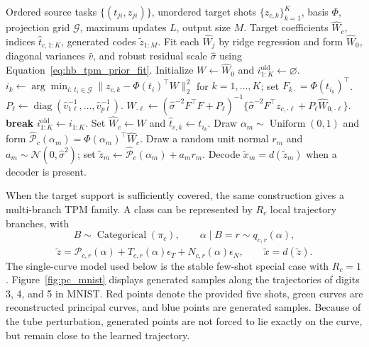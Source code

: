 \documentclass{article}
\begin{document}
\begin{algorithm}[H]
\caption{HB-TPM source fitting, target adaptation, and benchmark sampling}
\label{alg:hb_tpm}
\begin{algorithmic}[1]
\REQUIRE Ordered source tasks $\{(t_{ji},z_{ji})\}$, unordered target shots $\{z_{c,k}\}_{k=1}^{K}$, basis $\Phi$, projection grid $\mathcal G$, maximum updates $L$, output size $M$.
\ENSURE Target coefficients $\widehat W_c$, indices $\widehat t_{c,1:K}$, generated codes $\tilde z_{1:M}$.
\STATE Fit each $\widehat W_j$ by ridge regression and form $\widehat W_0$, diagonal variances $\widehat v$, and robust residual scale $\widehat\sigma$ using Equation~\ref{eq:hb_tpm_prior_fit}.
\STATE Initialize $W\leftarrow\widehat W_0$ and $i_{1:K}^{\mathrm{old}}\leftarrow\varnothing$.
    \STATE $i_k\leftarrow\arg\min_{i:\,t_i\in\mathcal G}\lVert z_{c,k}-\Phi(t_i)^\top W\rVert_2^2$ for $k=1,\ldots,K$; set $F_{k\cdot}=\Phi(t_{i_k})^\top$.
        \STATE $P_\ell\leftarrow\operatorname{diag}(\widehat v_{1\ell}^{-1},\ldots,\widehat v_{p\ell}^{-1})$.
        \STATE $W_{\cdot\ell}\leftarrow(\widehat\sigma^{-2}F^\top F+P_\ell)^{-1}\{\widehat\sigma^{-2}F^\top z_{c,\cdot\ell}+P_\ell\widehat W_{0,\cdot\ell}\}$.
    \ENDFOR
        \STATE \textbf{break}
    \ENDIF
    \STATE $i_{1:K}^{\mathrm{old}}\leftarrow i_{1:K}$.
\ENDFOR
\STATE Set $\widehat W_c\leftarrow W$ and $\widehat t_{c,k}\leftarrow t_{i_k}$.
    \STATE Draw $\alpha_m\sim\operatorname{Uniform}(0,1)$ and form $\widehat{\mathcal P}_c(\alpha_m)=\Phi(\alpha_m)^\top\widehat W_c$.
    \STATE Draw a random unit normal $r_m$ and $a_m\sim\mathcal N(0,\widehat\sigma^2)$; set $\tilde z_m\leftarrow\widehat{\mathcal P}_c(\alpha_m)+a_m r_m$.
\ENDFOR
\STATE Decode $\tilde x_m=d(\tilde z_m)$ when a decoder is present.
\end{algorithmic}
\end{algorithm}

When the target support is sufficiently covered, the same construction gives a multi-branch TPM family. A class can be represented by $R_c$ local trajectory branches, with
\[
	B\sim \operatorname{Categorical}(\pi_c),
	\qquad
	\alpha\mid B=r\sim q_{c,r}(\alpha),
\]
\[
	\tilde z
	=
	\widehat{\mathcal{P}}_{c,r}(\alpha)
	+
	T_{c,r}(\alpha)\epsilon_T
	+
	N_{c,r}(\alpha)\epsilon_N,
	\qquad
	\tilde x=d(\tilde z).
\]
The single-curve model used below is the stable few-shot special case with $R_c=1$. Figure~\ref{fig:pc_mnist} displays generated samples along the trajectories of digits 3, 4, and 5 in MNIST. Red points denote the provided five shots, green curves are reconstructed principal curves, and blue points are generated samples. Because of the tube perturbation, generated points are not forced to lie exactly on the curve, but remain close to the learned trajectory.
\end{document}
